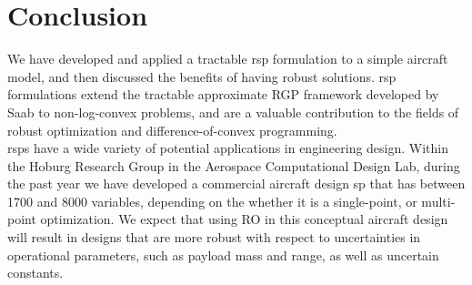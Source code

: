 \section{Conclusion}

We have developed and applied a tractable \gls{rsp} formulation to a simple aircraft model,
and then discussed the benefits of having robust solutions. \gls{rsp} formulations extend
the tractable approximate RGP framework developed by Saab to non-log-convex problems,
and are a valuable contribution to the fields of robust optimization and difference-of-convex programming.\\

\gls{rsp}s have a wide variety of potential applications in engineering design.
Within the Hoburg Research Group in the Aerospace Computational Design Lab, during the past year we
have developed a commercial aircraft design \gls{sp} that has between 1700 and 8000 variables,
depending on the whether it is a single-point, or multi-point optimization.
We expect that using RO in this conceptual aircraft design will result in designs
that are more robust with respect to uncertainties in operational parameters,
such as payload mass and range, as well as uncertain constants.



